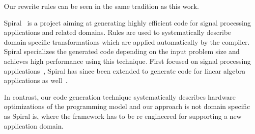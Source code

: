 Our rewrite rules can be seen in the same tradition as this work.

\bigskip

Spiral~\cite{PuschelMSXJPVJ04,OfenbeckRSOP13,SpampinatoP14} is a project aiming at generating highly efficient code for signal processing applications and related domains.
Rules are used to systematically describe domain specific transformations which are applied automatically by the compiler.
Spiral specializes the generated code depending on the input problem size and achieves high performance using this technique.
First focused on signal processing applications~\cite{PuschelMSXJPVJ04}, Spiral has since been extended to generate code for linear algebra applications as well~\cite{SpampinatoP14}.

In contrast, our code generation technique systematically describes hardware optimizations of the \OpenCL programming model and our approach is not domain specific as Spiral is, where the framework has to be re engineered for supporting a new application domain.




%
%
%
%

